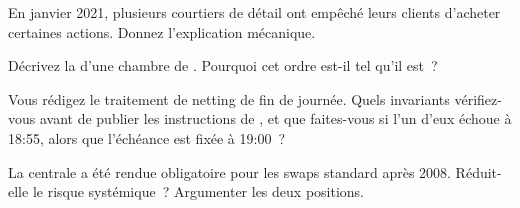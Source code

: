 \begin{interviewq}\label{iq:m1:clearing-and-settlement:3}
En janvier 2021, plusieurs courtiers de détail ont empêché leurs clients
d'acheter certaines actions. Donnez l'explication mécanique.
\end{interviewq}

\begin{interviewq}\label{iq:m1:clearing-and-settlement:4}
Décrivez la  d'une chambre de . Pourquoi cet
ordre est-il tel qu'il est~?
\end{interviewq}

\begin{interviewq}\label{iq:m1:clearing-and-settlement:5}
Vous rédigez le traitement de netting de fin de journée. Quels invariants vérifiez-vous
avant de publier les instructions de , et que faites-vous si l'un d'eux
échoue à 18:55, alors que l'échéance est fixée à 19:00~?
\end{interviewq}

\begin{interviewq}\label{iq:m1:clearing-and-settlement:6}
La  centrale a été rendue obligatoire pour les swaps standard après 2008.
Réduit-elle le risque systémique~? Argumenter les deux positions.
\end{interviewq}
